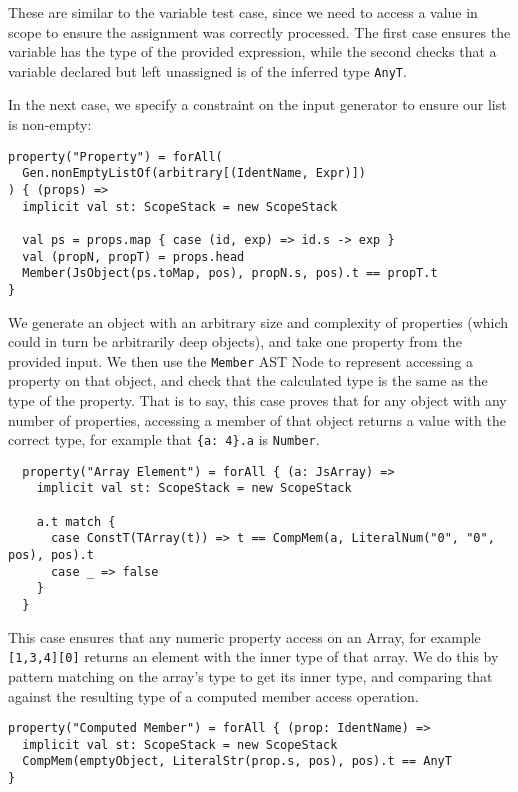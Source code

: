 \documentclass[british, twoside, openright]{bhamthesis}
\theoremstyle{definition}
\begin{document}
      These are similar to the variable test case, since we need to access a value in scope to ensure the assignment was correctly processed. The first case ensures the variable has the type of the provided expression, while the second checks that a variable declared but left unassigned is of the inferred type \texttt{AnyT}.

      In the next case, we specify a constraint on the input generator to ensure our list is non-empty:
      \begin{lstlisting}
property("Property") = forAll(
  Gen.nonEmptyListOf(arbitrary[(IdentName, Expr)])
) { (props) =>
  implicit val st: ScopeStack = new ScopeStack

  val ps = props.map { case (id, exp) => id.s -> exp }
  val (propN, propT) = props.head
  Member(JsObject(ps.toMap, pos), propN.s, pos).t == propT.t
}
      \end{lstlisting}

      We generate an object with an arbitrary size and complexity of properties (which could in turn be arbitrarily deep objects), and take one property from the provided input. We then use the \texttt{Member} AST Node to represent accessing a property on that object, and check that the calculated type is the same as the type of the property. That is to say, this case proves that for any object with any number of properties, accessing a member of that object returns a value with the correct type, for example that \texttt{\{a: 4\}.a} is \texttt{Number}.


      \begin{lstlisting}
  property("Array Element") = forAll { (a: JsArray) =>
    implicit val st: ScopeStack = new ScopeStack

    a.t match {
      case ConstT(TArray(t)) => t == CompMem(a, LiteralNum("0", "0", pos), pos).t
      case _ => false
    }
  }
      \end{lstlisting}

      This case ensures that any numeric property access on an Array, for example \texttt{[1,3,4][0]} returns an element with the inner type of that array. We do this by pattern matching on the array's type to get its inner type, and comparing that against the resulting type of a computed member access operation.

      \begin{lstlisting}
property("Computed Member") = forAll { (prop: IdentName) =>
  implicit val st: ScopeStack = new ScopeStack
  CompMem(emptyObject, LiteralStr(prop.s, pos), pos).t == AnyT
}
      \end{lstlisting}
\end{document}
